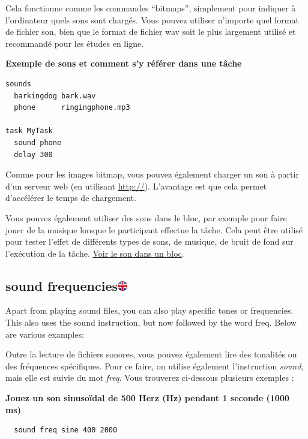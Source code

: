 \documentclass[
]{book}
\begin{document}
Cela fonctionne comme les commandes ``bitmaps'', simplement pour indiquer à l'ordinateur quels sons sont chargés. Vous pouvez utiliser n'importe quel format de fichier son, bien que le format de fichier wav soit le plus largement utilisé et recommandé pour les études en ligne.

\textbf{Exemple de sons et comment s'y référer dans une tâche}

\begin{verbatim}
sounds
  barkingdog bark.wav
  phone      ringingphone.mp3

task MyTask
  sound phone
  delay 300
\end{verbatim}

Comme pour les images bitmap, vous pouvez également charger un son à partir d'un serveur web (en utilisant \url{http://}). L'avantage est que cela permet d'accélérer le temps de chargement.

Vous pouvez également utiliser des sons dans le bloc, par exemple pour faire jouer de la musique lorsque le participant effectue la tâche. Cela peut être utilisé pour tester l'effet de différents types de sons, de musique, de bruit de fond sur l'exécution de la tâche. \protect\hyperlink{block-sound}{Voir le son dans un bloc}.

\hypertarget{sound-frequencies}{%
\subsection[sound frequencies]{\texorpdfstring{sound frequencies\href{https://www.psytoolkit.org/doc3.4.0/syntax.html\#sounds_as_frequencies}{\protect\includegraphics{img/ukflag.png}}}{sound frequencies}}\label{sound-frequencies}}

Apart from playing sound files, you can also play specific tones or frequencies. This also uses the sound instruction, but now followed by the word freq. Below are various examples:

Outre la lecture de fichiers sonores, vous pouvez également lire des tonalités ou des fréquences spécifiques. Pour ce faire, on utilise également l'instruction \emph{sound}, mais elle est suivie du mot \emph{freq}. Vous trouverez ci-dessous plusieurs exemples :

\textbf{Jouez un son sinusoïdal de 500 Herz (Hz) pendant 1 seconde (1000 ms)}

\begin{verbatim}
  sound freq sine 400 2000
\end{verbatim}
\end{document}
